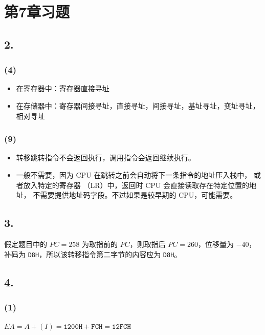 \documentclass[12pt, a4paper]{ctexart}
\begin{document}
\section*{第7章习题}

\subsection*{2.}

\subsubsection*{(4)}

\begin{itemize}
    \item 在寄存器中：寄存器直接寻址
    \item 在存储器中：寄存器间接寻址，直接寻址，间接寻址，基址寻址，变址寻址，相对寻址
\end{itemize}

\subsubsection*{(9)}

\begin{itemize}
    \item 转移跳转指令不会返回执行，调用指令会返回继续执行。
    \item 一般不需要，因为 CPU 在跳转之前会自动将下一条指令的地址压入栈中，
    或者放入特定的寄存器 （LR）中，返回时 CPU 会直接读取存在特定位置的地址，
    不需要提供地址码字段。不过如果是较早期的 CPU，可能需要。
\end{itemize}

\subsection*{3.}

假定题目中的 $PC=258$ 为取指前的 $PC$，则取指后 $PC=260$，位移量为 $-40$，
补码为 \texttt{D8H}，所以该转移指令第二字节的内容应为 \texttt{D8H}。

\subsection*{4.}

\subsubsection*{(1)}

$EA=A+(I)=\mathtt{1200H}+\mathtt{FCH}=\mathtt{12FCH}$
\end{document}
